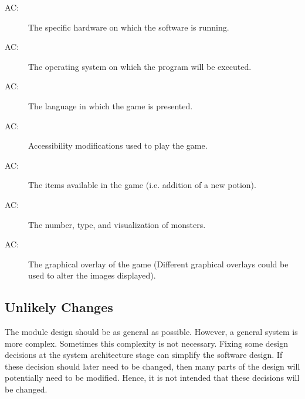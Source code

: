 \documentclass[12pt, titlepage]{article}
\newcounter{acnum}
\newcommand{\actheacnum}{AC\theacnum}
\begin{document}
        \bigskip\begin{description}
            \item[ \actheacnum \label{acHardware}:] The specific hardware on which the software is running.
            \item[ \actheacnum \label{acOs}:] The operating system on which the program will be executed.
            \item[ \actheacnum \label{acLanguage}:] The language in which the game is presented.
            \item[ \actheacnum \label{acAccessibility}:] Accessibility modifications used to play the game.
            \item[ \actheacnum \label{acItems}:] The items available in the game (i.e. addition of a new potion).
            \item[ \actheacnum \label{acMonsters}:] The number, type, and visualization of monsters.
            \item[ \actheacnum \label{acVisuals}:] The graphical overlay of the game (Different graphical overlays could be used to alter the images displayed).
        \end{description}

    \subsection{Unlikely Changes} \label{SecUchange}

        The module design should be as general as possible. However, a general system is more complex. Sometimes this complexity is not necessary. Fixing some design decisions at the system architecture stage can simplify the software design. If these decision should later need to be changed, then many parts of the design will potentially need to be modified. Hence, it is not intended that these decisions will be changed.
\end{document}
